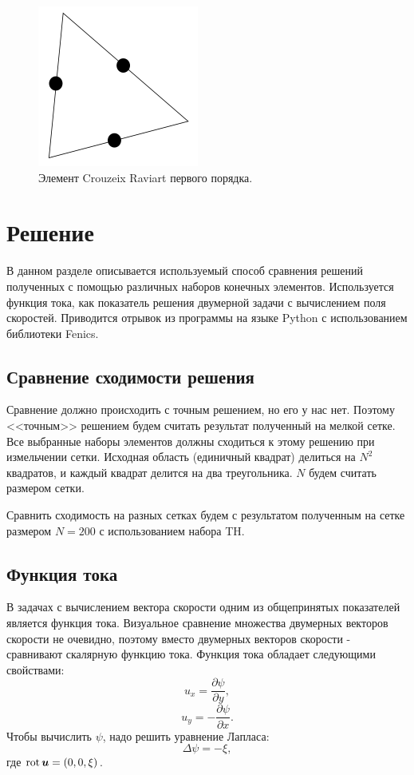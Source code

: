 \documentclass[12pt]{article}
\newcommand{\rot}{\mathop{\rm rot}\nolimits}
\begin{document}
\begin{figure}
	\begin{center}
		\includegraphics[width=200px]{pics/crouzeix1}
		\caption{Элемент Crouzeix Raviart первого порядка.}
		\label{fg:crouzeix1}
	\end{center}
\end{figure}

\section{Решение}
В данном разделе описывается используемый способ сравнения решений полученных с помощью различных наборов конечных элементов. Используется функция тока, как показатель решения двумерной задачи с вычислением поля скоростей. Приводится отрывок из программы на языке Python с использованием библиотеки Fenics.

\subsection{Сравнение сходимости решения}
Сравнение должно происходить с точным решением, но его у нас нет. Поэтому <<точным>> решением будем считать результат полученный на мелкой сетке. Все выбранные наборы элементов должны сходиться к этому решению при измельчении сетки. Исходная область (единичный квадрат) делиться на $N^2$ квадратов, и каждый квадрат делится на два треугольника. $N$ будем считать размером сетки.

Сравнить сходимость на разных сетках будем с результатом полученным на сетке размером $N=200$ с использованием набора TH. 

\subsection{Функция тока}
В задачах с вычислением вектора скорости одним из общепринятых показателей является функция тока. Визуальное сравнение множества двумерных векторов скорости не очевидно, поэтому вместо двумерных векторов скорости - сравнивают скалярную функцию тока. Функция тока обладает следующими свойствами:
\begin{equation}
u_x = \frac{\partial \psi}{\partial y},
\end{equation}
\begin{equation}
u_y = - \frac{\partial \psi}{\partial x}.
\end{equation}
Чтобы вычислить $\psi$, надо решить уравнение Лапласа:
\begin{equation}
\Delta\psi=-\xi,
\end{equation}
где $\rot {\bm u} = (0, 0, \xi)$.
\end{document}
